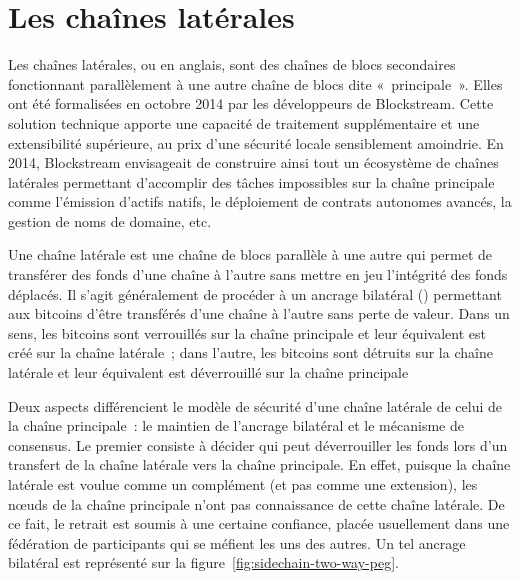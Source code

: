 \section*{Les chaînes latérales}


Les chaînes latérales, ou  en anglais, sont des chaînes de blocs secondaires fonctionnant parallèlement à une autre chaîne de blocs dite «~principale~». Elles ont été formalisées en octobre 2014 par les développeurs de Blockstream. Cette solution technique apporte une capacité de traitement supplémentaire et une extensibilité supérieure, au prix d'une sécurité locale sensiblement amoindrie. En 2014, Blockstream envisageait de construire ainsi tout un écosystème de chaînes latérales permettant d'accomplir des tâches impossibles sur la chaîne principale comme l'émission d'actifs natifs, le déploiement de contrats autonomes avancés, la gestion de noms de domaine, etc.


Une chaîne latérale est une chaîne de blocs parallèle à une autre qui permet de transférer des fonds d'une chaîne à l'autre sans mettre en jeu l'intégrité des fonds déplacés. Il s'agit généralement de procéder à un ancrage bilatéral () permettant aux bitcoins d'être transférés d'une chaîne à l'autre sans perte de valeur. Dans un sens, les bitcoins sont verrouillés sur la chaîne principale et leur équivalent est créé sur la chaîne latérale~; dans l'autre, les bitcoins sont détruits sur la chaîne latérale et leur équivalent est déverrouillé sur la chaîne principale

Deux aspects différencient le modèle de sécurité d'une chaîne latérale de celui de la chaîne principale~: le maintien de l'ancrage bilatéral et le mécanisme de consensus. Le premier consiste à décider qui peut déverrouiller les fonds lors d'un transfert de la chaîne latérale vers la chaîne principale. En effet, puisque la chaîne latérale est voulue comme un complément (et pas comme une extension), les nœuds de la chaîne principale n'ont pas connaissance de cette chaîne latérale. De ce fait, le retrait est soumis à une certaine confiance, placée usuellement dans une fédération de participants qui se méfient les uns des autres. Un tel ancrage bilatéral est représenté sur la figure~\ref{fig:sidechain-two-way-peg}.

